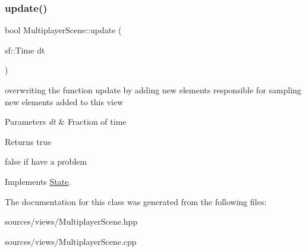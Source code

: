 \subsubsection{\texorpdfstring{update()}{update()}}
{\footnotesize\ttfamily bool Multiplayer\+Scene\+::update (\begin{DoxyParamCaption}\item[{sf\+::\+Time}]{dt }\end{DoxyParamCaption})\hspace{0.3cm}{\ttfamily [virtual]}}



overwriting the function update by adding new elements responsible for sampling new elements added to this view 


\begin{DoxyParams}{Parameters}
{\em dt} & Fraction of time \\
\hline
\end{DoxyParams}
\begin{DoxyReturn}{Returns}
true 

false if have a problem 
\end{DoxyReturn}


Implements \hyperlink{classState_acd5926bc7a373edff9e57f3ffe94ca13}{State}.



The documentation for this class was generated from the following files\+:\begin{DoxyCompactItemize}
\item 
sources/views/Multiplayer\+Scene.\+hpp\item 
sources/views/Multiplayer\+Scene.\+cpp\end{DoxyCompactItemize}
